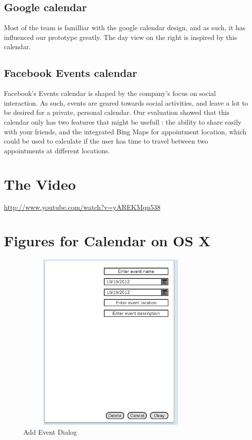 \documentclass{article}
\begin{document}
\subsection{Google calendar}

Most of the team is familliar with the google calendar design, and as such, it has 
influenced our prototype greatly. The day view on the right is inspired by this calendar.

\subsection{Facebook Events calendar}

Facebook's Events calendar is shaped by the company's focus on social interaction.
As such, events are geared towards social activities, and leave a lot to be desired
for a private, personal calendar. Our evaluation showed that this calendar only 
has two features that might be usefull : the ability to share easily with your friends,
and the integrated Bing Maps for appointment location, which could be used to calculate
if the user has time to travel between two appointments at different locations.



\section{The Video}

\url{http://www.youtube.com/watch?v=yAREKMqu538}


\appendix
\section{Figures for Calendar on OS X}

\begin{figure}
\centering
\includegraphics[height=9cm,width=9.5cm]{CMCLGDREvent.png}
\caption{Add Event Dialog}
\label{fig:addevent}
\end{figure}
\end{document}
